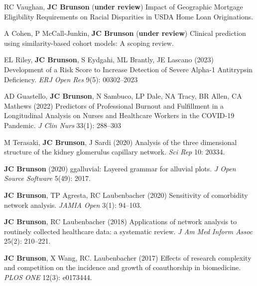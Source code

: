 \documentclass[10pt,a4paper]{article}
\begin{document}
\begin{enumerate}[label={[\arabic*]},labelindent=1cm,nolistsep]
\item
RC Vaughan, {\bfseries JC Brunson} ({\bfseries under review}) Impact of Geographic Mortgage Eligibility Requirements on Racial Disparities in USDA Home Loan Originations.
\item
A Cohen, P McCall-Junkin, {\bfseries JC Brunson} ({\bfseries under review}) Clinical prediction using similarity-based cohort models: A scoping review.
\item
EL Riley, {\bfseries JC Brunson}, S Eydgahi, ML Brantly, JE Lascano (2023) Development of a Risk Score to Increase Detection of Severe Alpha-1 Antitrypsin Deficiency. {\itshape ERJ Open Res} 9(5): 00302--2023
\item
AD Guastello, {\bfseries JC Brunson}, N Sambuco, LP Dale, NA Tracy, BR Allen, CA Mathews (2022) Predictors of Professional Burnout and Fulfillment in a Longitudinal Analysis on Nurses and Healthcare Workers in the COVID-19 Pandemic. {\itshape J Clin Nurs} 33(1): 288--303
\item
M Terasaki, {\bfseries JC Brunson}, J Sardi (2020) Analysis of the three dimensional structure of the kidney glomerulus capillary network. {\itshape Sci Rep} 10: 20334.
\item
{\bfseries JC Brunson} (2020) ggalluvial: Layered grammar for alluvial plots. {\itshape J Open Source Software} 5(49): 2017.
\item
{\bfseries JC Brunson}, TP Agresta, RC Laubenbacher (2020) Sensitivity of comorbidity network analysis. {\itshape JAMIA Open} 3(1): 94--103.
\item
{\bfseries JC Brunson}, RC Laubenbacher (2018) Applications of network analysis to routinely collected healthcare data: a systematic review. {\itshape J Am Med Inform Assoc} 25(2): 210--221.
\item
{\bfseries JC Brunson}, X Wang, RC. Laubenbacher (2017) Effects of research complexity and competition on the incidence and growth of coauthorship in biomedicine. {\itshape PLOS ONE} 12(3): e0173444.

\end{enumerate}
\end{document}
